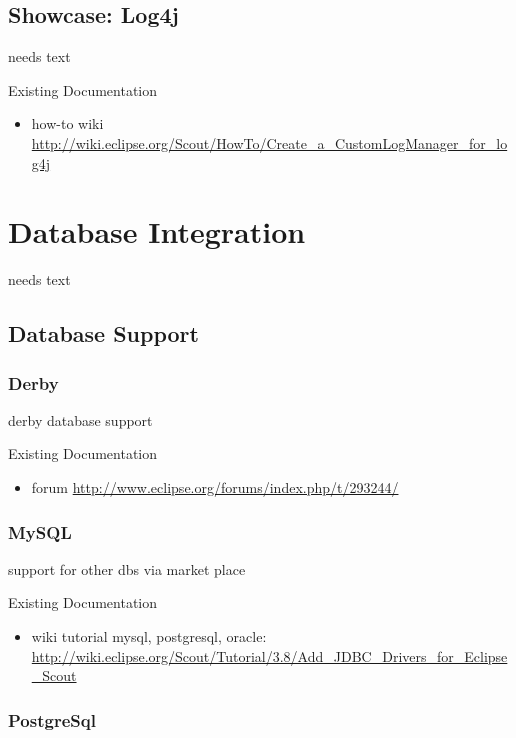 \documentclass[a4paper,10pt,twoside]{book}
\begin{document}
\section{Showcase: Log4j}
needs text

\noindent Existing Documentation
\begin{itemize}
  \item how-to wiki \url{http://wiki.eclipse.org/Scout/HowTo/Create_a_CustomLogManager_for_log4j}
\end{itemize}

\chapter{Database Integration}
needs text

\section{Database Support}

\subsection{Derby}
derby database support

\noindent Existing Documentation
\begin{itemize}
  \item forum \url{http://www.eclipse.org/forums/index.php/t/293244/}
\end{itemize}

\subsection{MySQL}
support for other dbs via market place

\noindent Existing Documentation
\begin{itemize}
  \item wiki tutorial mysql, postgresql, oracle: \url{http://wiki.eclipse.org/Scout/Tutorial/3.8/Add_JDBC_Drivers_for_Eclipse_Scout}
\end{itemize}

\subsection{PostgreSql}
\end{document}
